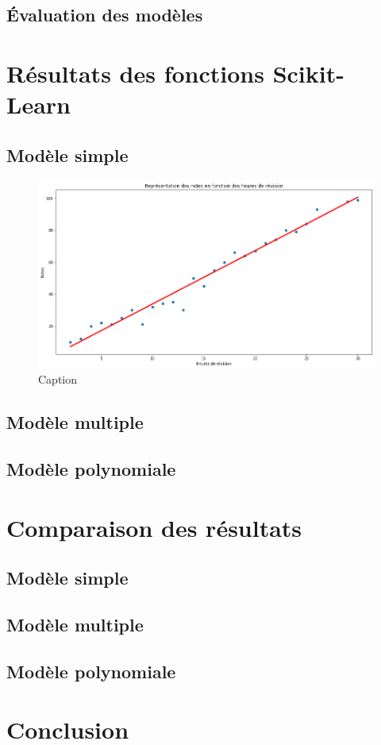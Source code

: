 \documentclass[french]{article}
\begin{document}
\subsection{Évaluation des modèles}

\newpage

\section{Résultats des fonctions Scikit-Learn}
\subsection{Modèle simple}

\begin{figure}[!htbp]
    \centering
    \includegraphics[width=\textwidth]{Rapport/images/modele_SLLS.png}
    \caption{Caption}
    \label{fig:my_label}
\end{figure}

\subsection{Modèle multiple}


\subsection{Modèle polynomiale}

\newpage

\section{Comparaison des résultats}
\subsection{Modèle simple}

\subsection{Modèle multiple}

\subsection{Modèle polynomiale}

\newpage

\section{Conclusion}
\end{document}
